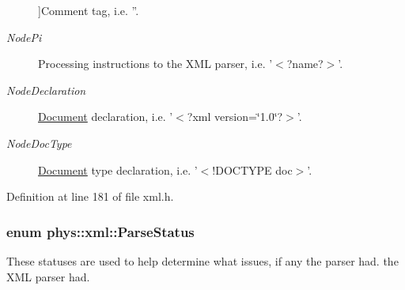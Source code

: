 \begin{Desc}
\begin{description}
{}]Comment tag, i.e. ''. \item[{\em 
\hypertarget{namespacephys_1_1xml_a668b0cc666a9d49f7c7222a7552115d3a3c09d11be0cea840f23f55e084cf72fa}{
NodePi}
\label{d9/d27/namespacephys_1_1xml_a668b0cc666a9d49f7c7222a7552115d3a3c09d11be0cea840f23f55e084cf72fa}
}]Processing instructions to the XML parser, i.e. '$<$?name?$>$'. \item[{\em 
\hypertarget{namespacephys_1_1xml_a668b0cc666a9d49f7c7222a7552115d3a1e3789aa995b7bf563ca8c43553ac035}{
NodeDeclaration}
\label{d9/d27/namespacephys_1_1xml_a668b0cc666a9d49f7c7222a7552115d3a1e3789aa995b7bf563ca8c43553ac035}
}]\hyperlink{classphys_1_1xml_1_1Document}{Document} declaration, i.e. '$<$?xml version=\char`\"{}1.0\char`\"{}?$>$'. \item[{\em 
\hypertarget{namespacephys_1_1xml_a668b0cc666a9d49f7c7222a7552115d3aca750034b7e4a34d53cfd3399b2bcd99}{
NodeDocType}
\label{d9/d27/namespacephys_1_1xml_a668b0cc666a9d49f7c7222a7552115d3aca750034b7e4a34d53cfd3399b2bcd99}
}]\hyperlink{classphys_1_1xml_1_1Document}{Document} type declaration, i.e. '$<$!DOCTYPE doc$>$'. \end{description}
\end{Desc}



Definition at line 181 of file xml.h.

\hypertarget{namespacephys_1_1xml_ae7aabb879b21c73d8183a54470f8917f}{
\subsubsection[{ParseStatus}]{\setlength{\rightskip}{0pt plus 5cm}enum {\bf phys::xml::ParseStatus}}}
\label{d9/d27/namespacephys_1_1xml_ae7aabb879b21c73d8183a54470f8917f}


These statuses are used to help determine what issues, if any the parser had. the XML parser had. 

